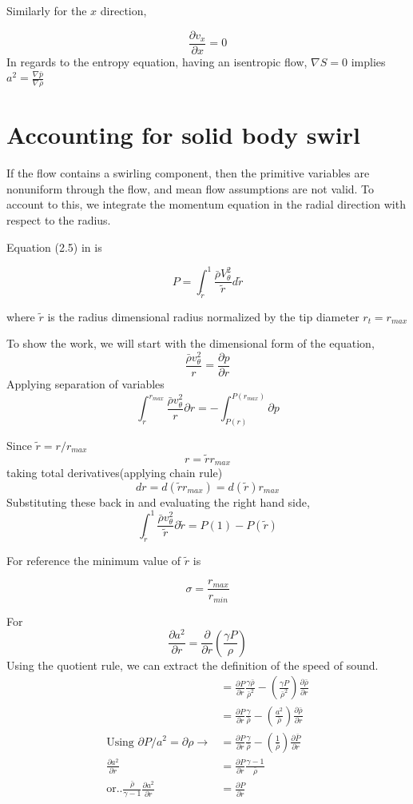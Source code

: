 \documentclass[12pt]{article}
\begin{document}
Similarly for the $x$ direction,

\[ \frac{\partial v_x}{\partial x} = 0 \]
In regards to the entropy equation, having an isentropic flow, $\nabla S = 0$ implies $a^2= \frac{\nabla \bar{p}}{ \nabla \bar{\rho}}$ 


\section{Accounting for solid body swirl}

If the flow contains a swirling component, then the primitive variables are nonuniform through the flow, and mean flow assumptions are not valid. To account to this, we integrate the momentum equation in the radial direction with respect to the radius. 

Equation (2.5) in \cite{Kousen1999} is 

\[P = \int_{\tilde{r}}^{1} \frac{\bar{\rho} V_{\theta}^2}{\tilde{r}} d\tilde{r}\] 

where $\tilde{r}$ is the radius dimensional radius normalized by the tip diameter $r_t = r_{max}$

To show the work, we will start with the dimensional form of the equation,
\[
\frac{\bar{\rho} v_{\theta}^2}{r} 
=\frac{\partial p}{\partial r}
\]
Applying separation of variables
\[
\int_{r}^{r_{max}} \frac{\bar{\rho} v_{\theta}^2}{r}\partial r 
=-\int_{P(r)}^{P(r_{max})}\partial p
\]

Since $\tilde{r} = r/r_{max}$
\[r = \tilde{r}r_{max}\]
taking total derivatives(applying chain rule)
\[dr = d(\tilde{r}r_{max}) = d(\tilde{r})r_{max}\]
Substituting these back in and evaluating the right hand side,
\[
\int_{\tilde{r}}^{1} \frac{\bar{\rho} v_{\theta}^2}{\tilde{r}}\partial \tilde{r} 
=P(1)-P(\tilde{r})
\]

For reference the minimum value of $\tilde{r}$ is

\[\sigma = \frac{r_{max}}{r_{min}}\]

For 
\[\frac{\partial a^2}{\partial r } = \frac{\partial}{\partial r} \left( \frac{\gamma P}{\rho} \right)\]
Using the quotient rule, we can extract the definition of the speed of sound.
\begin{align*}
&= \frac{\partial P}{\partial r} \frac{\gamma \bar{\rho}}{\bar{\rho}^2} - \left( \frac{\gamma P}{\bar{\rho}^2} \right) \frac{\partial \bar{\rho}}{\partial r}\\
&=  \frac{\partial P}{\partial r} \frac{\gamma }{\bar{\rho}} - \left( \frac{a^2}{\bar{\rho}} \right) \frac{\partial \bar{\rho} }{\partial r}\\ \text{Using } \partial P/a^2 = \partial \rho \rightarrow &= \frac{\partial P}{\partial r} \frac{\gamma }{\bar{\rho}} - \left( \frac{1}{\bar{\rho}} \right) \frac{\partial \bar{ P} }{\partial r}\\
\frac{\partial a^2}{\partial r} &= \frac{\partial P}{\partial r} \frac{\gamma - 1}{\bar{\rho}}  \\ \text{or..}
\frac{\bar{\rho}}{\gamma -1}\frac{\partial a^2}{\partial r} &= \frac{\partial P}{\partial r} 
\end{align*}
\end{document}
